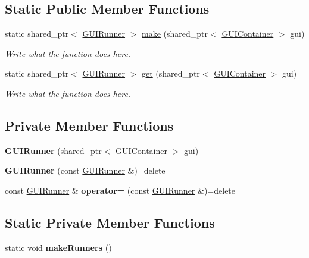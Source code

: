 \subsection*{Static Public Member Functions}
\begin{DoxyCompactItemize}
\item 
static shared\+\_\+ptr$<$ \hyperlink{classGUIRunner}{G\+U\+I\+Runner} $>$ \hyperlink{classGUIRunner_a75d10817e13347f279c658ef35e18686}{make} (shared\+\_\+ptr$<$ \hyperlink{classGUIContainer}{G\+U\+I\+Container} $>$ gui)
\begin{DoxyCompactList}\small\item\em Write what the function does here. \end{DoxyCompactList}\item 
static shared\+\_\+ptr$<$ \hyperlink{classGUIRunner}{G\+U\+I\+Runner} $>$ \hyperlink{classGUIRunner_a5e79f6335a17c69fa02eac997cc610bf}{get} (shared\+\_\+ptr$<$ \hyperlink{classGUIContainer}{G\+U\+I\+Container} $>$ gui)
\begin{DoxyCompactList}\small\item\em Write what the function does here. \end{DoxyCompactList}\end{DoxyCompactItemize}
\subsection*{Private Member Functions}
\begin{DoxyCompactItemize}
\item 
\hypertarget{classGUIRunner_addadbd965220a1a8d699dc6dcd3e211b}{{\bfseries G\+U\+I\+Runner} (shared\+\_\+ptr$<$ \hyperlink{classGUIContainer}{G\+U\+I\+Container} $>$ gui)}\label{classGUIRunner_addadbd965220a1a8d699dc6dcd3e211b}

\item 
\hypertarget{classGUIRunner_aca0cc460589930f95ff6eee66e1028a2}{{\bfseries G\+U\+I\+Runner} (const \hyperlink{classGUIRunner}{G\+U\+I\+Runner} \&)=delete}\label{classGUIRunner_aca0cc460589930f95ff6eee66e1028a2}

\item 
\hypertarget{classGUIRunner_afd663758b5632f28b6544479a055de2c}{const \hyperlink{classGUIRunner}{G\+U\+I\+Runner} \& {\bfseries operator=} (const \hyperlink{classGUIRunner}{G\+U\+I\+Runner} \&)=delete}\label{classGUIRunner_afd663758b5632f28b6544479a055de2c}

\end{DoxyCompactItemize}
\subsection*{Static Private Member Functions}
\begin{DoxyCompactItemize}
\item 
\hypertarget{classGUIRunner_a41c80c195e9dd4309df502f3427b1d36}{static void {\bfseries make\+Runners} ()}\label{classGUIRunner_a41c80c195e9dd4309df502f3427b1d36}

\end{DoxyCompactItemize}
